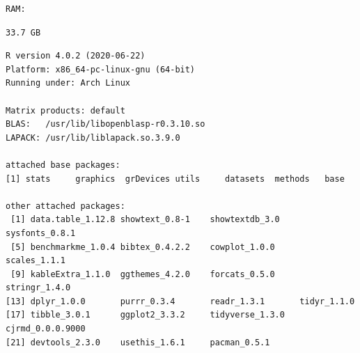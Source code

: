 \documentclass[a4paper, notitlepage]{extreport}
\begin{document}
\begin{verbatim}
RAM:         
\end{verbatim}

\begin{verbatim}
33.7 GB
\end{verbatim}

\begin{verbatim}
R version 4.0.2 (2020-06-22)
Platform: x86_64-pc-linux-gnu (64-bit)
Running under: Arch Linux

Matrix products: default
BLAS:   /usr/lib/libopenblasp-r0.3.10.so
LAPACK: /usr/lib/liblapack.so.3.9.0

attached base packages:
[1] stats     graphics  grDevices utils     datasets  methods   base     

other attached packages:
 [1] data.table_1.12.8 showtext_0.8-1    showtextdb_3.0    sysfonts_0.8.1   
 [5] benchmarkme_1.0.4 bibtex_0.4.2.2    cowplot_1.0.0     scales_1.1.1     
 [9] kableExtra_1.1.0  ggthemes_4.2.0    forcats_0.5.0     stringr_1.4.0    
[13] dplyr_1.0.0       purrr_0.3.4       readr_1.3.1       tidyr_1.1.0      
[17] tibble_3.0.1      ggplot2_3.3.2     tidyverse_1.3.0   cjrmd_0.0.0.9000 
[21] devtools_2.3.0    usethis_1.6.1     pacman_0.5.1     
\end{verbatim}
\end{document}

